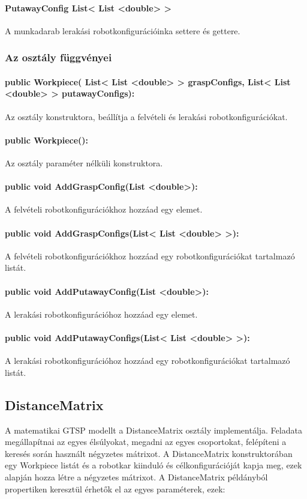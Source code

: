 \paragraph{PutawayConfig List< List <double> >}

A munkadarab lerakási robotkonfigurációinka settere és gettere.

\subsubsection{Az osztály függvényei}
\paragraph{public Workpiece( List< List <double> > graspConfigs, List< List <double> > putawayConfigs):}
Az osztály konstruktora, beállítja a felvételi és lerakási robotkonfigurációkat.
\paragraph{public Workpiece():}
Az osztály paraméter nélküli konstruktora.
\paragraph{public void AddGraspConfig(List <double>):}
A felvételi robotkonfigurációkhoz hozzáad egy elemet.
\paragraph{public void AddGraspConfigs(List< List <double> >):}
A felvételi robotkonfigurációkhoz hozzáad egy robotkonfigurációkat tartalmazó listát.
\paragraph{public void AddPutawayConfig(List <double>):}
A lerakási robotkonfigurációhoz hozzáad egy elemet.
\paragraph{public void AddPutawayConfigs(List< List <double> >):}
A lerakási robotkonfigurációhoz hozzáad egy robotkonfigurációkat tartalmazó listát.


\subsection{DistanceMatrix}

A matematikai GTSP modellt a DistanceMatrix osztály implementálja. Feladata megállapítnai az egyes élsúlyokat, megadni az egyes csoportokat, felépíteni a keresés során használt négyzetes mátrixot.
A DistanceMatrix konstruktorában egy Workpiece listát és a robotkar kiinduló és célkonfigurációját kapja meg, ezek alapján hozza létre a négyzetes mátrixot. A DistanceMatrix példányból propertiken keresztül érhetők el az egyes paraméterek, ezek:

